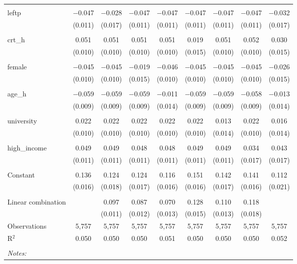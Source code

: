 \begin{table}[!htbp]
\begin{tabular}{@{\extracolsep{5pt}}lcccccccc}
  & & & & & & & & \\ 
 leftp & $-$0.047 & $-$0.028 & $-$0.047 & $-$0.047 & $-$0.047 & $-$0.047 & $-$0.047 & $-$0.032 \\ 
  & (0.011) & (0.017) & (0.011) & (0.011) & (0.011) & (0.011) & (0.011) & (0.017) \\ 
  & & & & & & & & \\ 
 crt\_h & 0.051 & 0.051 & 0.051 & 0.051 & 0.019 & 0.051 & 0.052 & 0.030 \\ 
  & (0.010) & (0.010) & (0.010) & (0.010) & (0.015) & (0.010) & (0.010) & (0.015) \\ 
  & & & & & & & & \\ 
 female & $-$0.045 & $-$0.045 & $-$0.019 & $-$0.046 & $-$0.045 & $-$0.045 & $-$0.045 & $-$0.026 \\ 
  & (0.010) & (0.010) & (0.015) & (0.010) & (0.010) & (0.010) & (0.010) & (0.015) \\ 
  & & & & & & & & \\ 
 age\_h & $-$0.059 & $-$0.059 & $-$0.059 & $-$0.011 & $-$0.059 & $-$0.059 & $-$0.058 & $-$0.013 \\ 
  & (0.009) & (0.009) & (0.009) & (0.014) & (0.009) & (0.009) & (0.009) & (0.014) \\ 
  & & & & & & & & \\ 
 university & 0.022 & 0.022 & 0.022 & 0.022 & 0.022 & 0.013 & 0.022 & 0.016 \\ 
  & (0.010) & (0.010) & (0.010) & (0.010) & (0.010) & (0.014) & (0.010) & (0.014) \\ 
  & & & & & & & & \\ 
 high\_income & 0.049 & 0.049 & 0.048 & 0.048 & 0.049 & 0.049 & 0.034 & 0.043 \\ 
  & (0.011) & (0.011) & (0.011) & (0.011) & (0.011) & (0.011) & (0.017) & (0.017) \\ 
  & & & & & & & & \\ 
 Constant & 0.136 & 0.124 & 0.124 & 0.116 & 0.151 & 0.142 & 0.141 & 0.112 \\ 
  & (0.016) & (0.018) & (0.017) & (0.016) & (0.016) & (0.017) & (0.016) & (0.021) \\ 
  & & & & & & & & \\ 
Linear combination &   & 0.097 & 0.087 & 0.070 & 0.128 & 0.110 & 0.118 &  \\ 
 &  & (0.011) & (0.012) & (0.013) & (0.015) & (0.013) & (0.018) &  \\ 
Observations & 5,757 & 5,757 & 5,757 & 5,757 & 5,757 & 5,757 & 5,757 & 5,757 \\ 
R$^{2}$ & 0.050 & 0.050 & 0.050 & 0.051 & 0.050 & 0.050 & 0.050 & 0.052 \\ 
\hline \\[-1.8ex] 
\textit{Notes:} & \multicolumn{8}{l}{} \\ 
\end{tabular} 
\end{table} 
